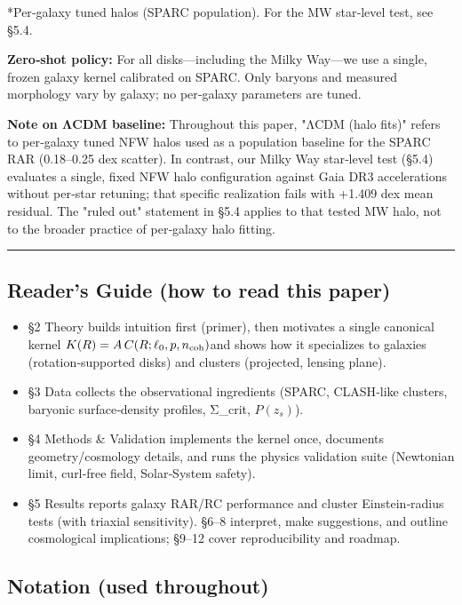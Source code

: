 \documentclass[11pt,a4paper]{article}
\begin{document}
*Per‑galaxy tuned halos (SPARC population). For the MW star‑level test, see §5.4.


\textbf{Zero‑shot policy:} For all disks—including the Milky Way—we use a single, frozen galaxy kernel calibrated on SPARC. Only baryons and measured morphology vary by galaxy; no per‑galaxy parameters are tuned.


\textbf{Note on ΛCDM baseline:} Throughout this paper, "ΛCDM (halo fits)" refers to per‑galaxy tuned NFW halos used as a population baseline for the SPARC RAR (0.18–0.25 dex scatter). In contrast, our Milky Way star‑level test (§5.4) evaluates a single, fixed NFW halo configuration against Gaia DR3 accelerations without per‑star retuning; that specific realization fails with +1.409 dex mean residual. The "ruled out" statement in §5.4 applies to that tested MW halo, not to the broader practice of per‑galaxy halo fitting.


\medskip\hrule\medskip


\subsection{Reader’s Guide (how to read this paper)}


\begin{itemize}
\item §2 Theory builds intuition first (primer), then motivates a single canonical kernel $\allowbreak K(R)=A\,C(R;\ell_0,p,n_{\rm coh})$\allowbreak  and shows how it specializes to galaxies (rotation‑supported disks) and clusters (projected, lensing plane).
\item §3 Data collects the observational ingredients (SPARC, CLASH‑like clusters, baryonic surface‑density profiles, Σ\_crit, $P(z_s)$).
\item §4 Methods \& Validation implements the kernel once, documents geometry/cosmology details, and runs the physics validation suite (Newtonian limit, curl‑free field, Solar‑System safety).
\item §5 Results reports galaxy RAR/RC performance and cluster Einstein‑radius tests (with triaxial sensitivity). §6–8 interpret, make suggestions, and outline cosmological implications; §9–12 cover reproducibility and roadmap.
\end{itemize}


\subsection{Notation (used throughout)}
\end{document}
